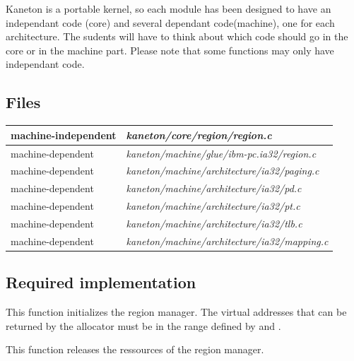 Kaneton is a portable kernel, so each module has been designed to have an independant code (core) and several dependant code(machine), one for each architecture. The sudents will have to think about which code should go in the core or in the machine part. Please note that some functions may only have independant code.

\subsection*{Files}

\begin{tabular}{| l | l |}
  \hline
  machine-independent & {\em kaneton/core/region/region.c}\\\hline
  machine-dependent & {\em kaneton/machine/glue/ibm-pc.ia32/region.c}\\\hline
  machine-dependent & {\em kaneton/machine/architecture/ia32/paging.c}\\\hline
  machine-dependent & {\em kaneton/machine/architecture/ia32/pd.c}\\\hline
  machine-dependent & {\em kaneton/machine/architecture/ia32/pt.c}\\\hline
  machine-dependent & {\em kaneton/machine/architecture/ia32/tlb.c}\\\hline
  machine-dependent & {\em kaneton/machine/architecture/ia32/mapping.c}\\\hline
\end{tabular}

\subsection*{Required implementation}

{
  This function initializes the region manager. The virtual addresses that can
  be returned by the allocator must be in the range defined by 
  and .
}

{
  This function releases the ressources of the region manager.
}

